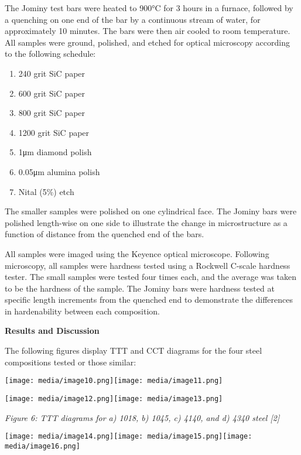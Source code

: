\documentclass[]{article}
\begin{document}
The Jominy test bars were heated to 900°C for 3 hours in a furnace,
followed by a quenching on one end of the bar by a continuous stream of
water, for approximately 10 minutes. The bars were then air cooled to
room temperature. All samples were ground, polished, and etched for
optical microscopy according to the following schedule:

\begin{enumerate}
\def\labelenumi{\arabic{enumi}.}
\item
  240 grit SiC paper
\item
  600 grit SiC paper
\item
  800 grit SiC paper
\item
  1200 grit SiC paper
\item
  1μm diamond polish
\item
  0.05μm alumina polish
\item
  Nital (5\%) etch
\end{enumerate}

The smaller samples were polished on one cylindrical face. The Jominy
bars were polished length-wise on one side to illustrate the change in
microstructure as a function of distance from the quenched end of the
bars.

All samples were imaged using the Keyence optical microscope. Following
microscopy, all samples were hardness tested using a Rockwell C-scale
hardness tester. The small samples were tested four times each, and the
average was taken to be the hardness of the sample. The Jominy bars were
hardness tested at specific length increments from the quenched end to
demonstrate the differences in hardenability between each composition.

\textbf{Results and Discussion}

The following figures display TTT and CCT diagrams for the four steel
compositions tested or those similar:

\texttt{[image: media/image10.png]}\texttt{[image: media/image11.png]}

\texttt{[image: media/image12.png]}\texttt{[image: media/image13.png]}

\emph{Figure 6: TTT diagrams for a) 1018, b) 1045, c) 4140, and d) 4340
steel {[}2{]}}

\texttt{[image: media/image14.png]}\texttt{[image: media/image15.png]}\texttt{[image: media/image16.png]}
\end{document}
